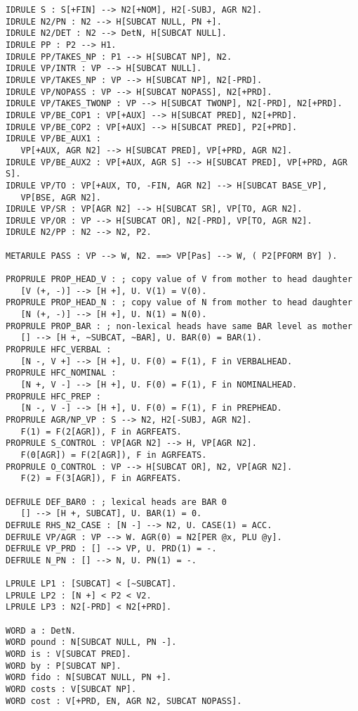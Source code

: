 {\begin{verbatim}
IDRULE S : S[+FIN] --> N2[+NOM], H2[-SUBJ, AGR N2].
IDRULE N2/PN : N2 --> H[SUBCAT NULL, PN +].
IDRULE N2/DET : N2 --> DetN, H[SUBCAT NULL].
IDRULE PP : P2 --> H1.
IDRULE PP/TAKES_NP : P1 --> H[SUBCAT NP], N2.
IDRULE VP/INTR : VP --> H[SUBCAT NULL].
IDRULE VP/TAKES_NP : VP --> H[SUBCAT NP], N2[-PRD].
IDRULE VP/NOPASS : VP --> H[SUBCAT NOPASS], N2[+PRD].
IDRULE VP/TAKES_TWONP : VP --> H[SUBCAT TWONP], N2[-PRD], N2[+PRD].
IDRULE VP/BE_COP1 : VP[+AUX] --> H[SUBCAT PRED], N2[+PRD].
IDRULE VP/BE_COP2 : VP[+AUX] --> H[SUBCAT PRED], P2[+PRD].
IDRULE VP/BE_AUX1 :
   VP[+AUX, AGR N2] --> H[SUBCAT PRED], VP[+PRD, AGR N2].
IDRULE VP/BE_AUX2 : VP[+AUX, AGR S] --> H[SUBCAT PRED], VP[+PRD, AGR S].
IDRULE VP/TO : VP[+AUX, TO, -FIN, AGR N2] --> H[SUBCAT BASE_VP], 
   VP[BSE, AGR N2].
IDRULE VP/SR : VP[AGR N2] --> H[SUBCAT SR], VP[TO, AGR N2].
IDRULE VP/OR : VP --> H[SUBCAT OR], N2[-PRD], VP[TO, AGR N2].
IDRULE N2/PP : N2 --> N2, P2.

METARULE PASS : VP --> W, N2. ==> VP[Pas] --> W, ( P2[PFORM BY] ).

PROPRULE PROP_HEAD_V : ; copy value of V from mother to head daughter
   [V (+, -)] --> [H +], U. V(1) = V(0).
PROPRULE PROP_HEAD_N : ; copy value of N from mother to head daughter
   [N (+, -)] --> [H +], U. N(1) = N(0).
PROPRULE PROP_BAR : ; non-lexical heads have same BAR level as mother
   [] --> [H +, ~SUBCAT, ~BAR], U. BAR(0) = BAR(1).
PROPRULE HFC_VERBAL :
   [N -, V +] --> [H +], U. F(0) = F(1), F in VERBALHEAD.
PROPRULE HFC_NOMINAL :
   [N +, V -] --> [H +], U. F(0) = F(1), F in NOMINALHEAD.
PROPRULE HFC_PREP :
   [N -, V -] --> [H +], U. F(0) = F(1), F in PREPHEAD.
PROPRULE AGR/NP_VP : S --> N2, H2[-SUBJ, AGR N2]. 
   F(1) = F(2[AGR]), F in AGRFEATS.
PROPRULE S_CONTROL : VP[AGR N2] --> H, VP[AGR N2]. 
   F(0[AGR]) = F(2[AGR]), F in AGRFEATS.
PROPRULE O_CONTROL : VP --> H[SUBCAT OR], N2, VP[AGR N2]. 
   F(2) = F(3[AGR]), F in AGRFEATS.

DEFRULE DEF_BAR0 : ; lexical heads are BAR 0
   [] --> [H +, SUBCAT], U. BAR(1) = 0.
DEFRULE RHS_N2_CASE : [N -] --> N2, U. CASE(1) = ACC.
DEFRULE VP/AGR : VP --> W. AGR(0) = N2[PER @x, PLU @y].
DEFRULE VP_PRD : [] --> VP, U. PRD(1) = -.
DEFRULE N_PN : [] --> N, U. PN(1) = -.

LPRULE LP1 : [SUBCAT] < [~SUBCAT].
LPRULE LP2 : [N +] < P2 < V2.
LPRULE LP3 : N2[-PRD] < N2[+PRD].

WORD a : DetN.
WORD pound : N[SUBCAT NULL, PN -].
WORD is : V[SUBCAT PRED].
WORD by : P[SUBCAT NP].
WORD fido : N[SUBCAT NULL, PN +].
WORD costs : V[SUBCAT NP].
WORD cost : V[+PRD, EN, AGR N2, SUBCAT NOPASS].
\end{verbatim}
}
